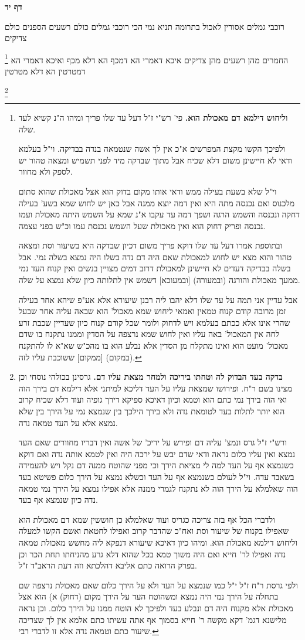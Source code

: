 \documentclass[12pt, openany]{book}
\newcommand{\sethebfont}{
\fontsize{10.5pt}{21.0pt} \selectfont
}
\newcommand{\twocol}[1]{
	{\sethebfont \begin{multicols}{2}
			#1
	\end{multicols}}	
}
\newcommand{\sectname}{}
\newcommand{\newsection}[1]{
	\addcontentsline{toc}{section}{#1}
	\renewcommand{\sectname}{#1}	
	\vspace{-\baselineskip}
	\begin{center}
		\textbf{%
\fontsize{16pt}{16pt}\selectfont
			#1}
	\end{center}
	\vspace{-\baselineskip}
	\nopagebreak
}
\newcommand{\footnotecomment}[1]{
	\renewcommand\thefootnote{}
	\footnote{#1}}
\newcommand{\commenta}[1]{\footnotecomment{#1}}
\begin{document}
\newsection{דף יד}
\twocol{רוכבי גמלים אסורין לאכול בתרומה תניא נמי הכי רוכבי גמלים כולם רשעים הספנים כולם צדיקים
\commenta{\textbf{וליחוש דילמא דם מאכולת הוא.} פי' רש"י ז"ל דעל עד שלו פריך ומיהו ה"נ קשיא לעד שלה.\par ולפיכך הקשו מקצת המפרשים א"כ אין לך אשה שנטמאה בנדה בבדיקה. וי"ל בעלמא ודאי לא חיישינן משום דלא שכיח אבל מתוך שבדקה מיד לפני תשמיש ומצאה טהור יש לספק ולא מחוור.\par וי"ל שלא בשעת בעילה ממש ודאי אותו מקום בדוק הוא אצל מאכולת שהוא סתום מלכנוס ואם נכנסה מתה היא ואין דמה יוצא ממנה אבל כאן יש לחוש שמא בשע' בעילה דחקה ונכנסה והשמש הרגה ושפך דמה עד עקבו א"נ שמא על השמש היתה מאכולת ועמו נכנסה ופריק דחוק הוא ואין מאכולת שעל השמש נכנסת עמו וכ"ש בפני עצמה.\par ובתוספת אמרו דעל עד שלו דוקא פריך משום דכיון שבדקה היא בשיעור וסת ומצאה טהור והוא מצא יש לחוש למאכולת שאם היה דם נדה בשלו היה נמצא בשלה נמי. אבל בשלה בבדיקה דעדים לא חיישינן למאכולת דרוב דמים מצויין בנשים ואין קנוח העד נמי ממעך מאכולת והורגה (ובמעורה) [ובמעוכא] דשמש אין לתלותה כיון שלא נמצא על שלה.\par אבל עדיין אני תמה על עד שלו דלא יהבו ליה רבנן שיעורא אלא אע"פ שיהא אחר בעילה זמן מרובה קודם קנוח טמאין ואמאי ליחוש שמא מאכול' הוא שבאה עליה אחר שבעל שהרי אינו אלא ככתם בעלמא ויש לדחוק ולומר שכל קודם קנוח כיון שעדיין שכבת זרע לחה אין המאכול' באה עליו ואין לחוש שמא נרצפה על הסדין וממנו נתקנח בו שדם מאכול' מועט הוא ואינו מתקלח מן הסדין אלא נבלע הוא בו מהכ"ש שא"א לו להתקנח (במקום) [ממקום] ששוכבת עליו לזה. }
החמרים מהן רשעים מהן צדיקים איכא דאמרי הא דמכף הא דלא מכף ואיכא דאמרי הא דמטרטין הא דלא מטרטין 
\commenta{\textbf{בדקה בעד הבדוק לה וטחתו ביריכה ולמחר מצאת עליו דם.} גרסינן בכולהי נוסחי וכן מצינו בשם ר"ח. ופירושו שמצאת עליו על העד דליכא למיתני אלא דילמא דם בירך הוה ואי הוה בירך נמי כתם הוא וטמא וכיון דאיכא ספיקא דירך גופיה ועוד דלא שכיח קרוב הוא יותר לתלות בעד לטומאת נדה ולא בירך הילכך בין שנמצא נמי על הירך בין שלא נמצא אלא על העד טמאה נדה.\par ורש"י ז"ל גרס ונמצ' עליה דם ופירש על יריכ' של אשה ואין דבריו מחוורים שאם העד נמצא ואין עליו כלום נראה ודאי שדם יבש על ירכה היה ואין לטמא אותה נדה ואם דוקא כשנמצא אף על העד למה לי מציאת הירך וכי מפני שהוטח ממנה דם נקל ויש להעמידה בשאבד עדה. וי"ל לעולם כשנמצא אף על העד וכשלא נמצא על הירך כלום פשיטא בעד הוה שאלמלא על הירך הוה לא נתקנח לגמרי ממנה אלא אפילו נמצא על הירך נמי טמאה נדה כיון שנמצא אף בעד.\par ולדברי הכל אף בזה צריכה כגריס ועוד שאלמלא כן חוששין שמא דם מאכולת הוא שאפילו בקנוח של שיעור וסת ואח"כ שהדבר קרוב ואפילו לחטאת ואשם הקשו למעלה וליחוש דילמא מאכולת הוא. ומיהו כיון דאיכא שיעורא דנפקא ליה מחשש מאכולת טמאה נדה ואפילו לר' חייא ואם היה משוך טמא בכל שהוא דלא גרע מהניחתו תחת הכר וכן בפרק הרואה כתם אליבא דהלכתא וזה דעת הראב"ד ז"ל.\par ולפי גרסת ר"ח ז"ל י"ל כמו שנמצא על העד ולא על הירך כלום שאם מאכולת נרצפה שם בתחלה על הירך נמי היה נמצא ומשהוטח העד על הירך מקום (דחוק) א) הוא אצל מאכולת אלא מקנוח היה דם ונבלע בעד ולפיכך לא הוטח ממנו על הירך כלום. וכן נראה מלישנא דגמ' דקא מקשה ר' חייא בסמוך אף אתה עשיתו כתם אלמא אין לך שצריכה שיעור כתם וטמאה נדה אלא זו לדברי רבי. }
}
\end{document}
